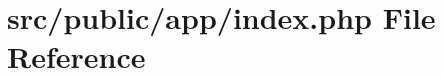 \hypertarget{app_2index_8php}{}\section{src/public/app/index.php File Reference}
\label{app_2index_8php}
